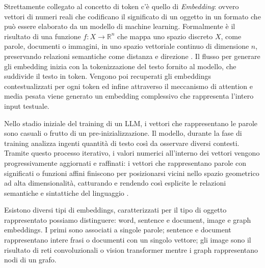 Strettamente collegato al concetto di token c'è quello di \textit{Embedding}: ovvero vettori di numeri reali che codificano il significato di un oggetto in un formato che può essere elaborato da un modello di machine learning. Formalmente è il risultato di una funzione $f: X \rightarrow \mathbb{R}^n$ che mappa uno spazio discreto $X$, come parole, documenti o immagini, in uno spazio vettoriale continuo di dimensione $n$, preservando relazioni semantiche come distanza e direzione \cite{cosa_sono_gli_embeddings}. 
Il flusso per generare gli embedding inizia con la tokenizzazione del testo fornito al modello, che suddivide il testo in token.
Vengono poi recuperati gli embeddings contestualizzati per ogni token ed infine attraverso il meccanismo di attention e media pesata viene generato un embedding complessivo che rappresenta l'intero input testuale.

Nello stadio iniziale del training di un LLM, i vettori che rappresentano le parole sono casuali o frutto di un pre-inizializzazione. Il modello, durante la fase di training analizza ingenti quantità di testo così da osservare diversi contesti.
Tramite questo processo iterativo, i valori numerici all'interno dei vettori vengono progressivamente aggiornati e raffinati: i vettori che rappresentano parole con significati o funzioni affini finiscono per posizionarsi vicini nello spazio geometrico ad alta dimensionalità, catturando e rendendo così esplicite le relazioni semantiche e sintattiche del linguaggio \cite{mikolov2013efficientestimationwordrepresentations}.

Esistono diversi tipi di embeddings, caratterizzati per il tipo di oggetto rappresentato possiamo distinguere: word, sentence e document, image e graph embeddings.
I primi sono associati a singole parole; sentence e document rappresentano intere frasi o documenti con un singolo vettore; gli image sono il risultato di reti convoluzionali o vision transformer mentre i graph rappresentano nodi di un grafo.

